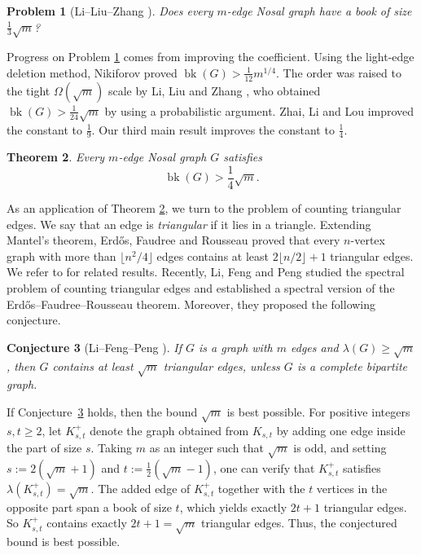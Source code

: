\documentclass[11pt,a4paper]{article}
\newtheorem{theorem}{Theorem}[section]
\newtheorem{conjecture}[theorem]{Conjecture}
\newtheorem{problem}[theorem]{Problem}
\theoremstyle{definition}
\theoremstyle{plain}
\newcommand{\bk}{\operatorname{bk}}
\renewcommand{\ge}{\geqslant}
\begin{document}
\begin{problem}[Li--Liu--Zhang \cite{LiLiuZhang26}] \label{prob-bk-13}
Does every $m$-edge Nosal graph have a book of size $\frac{1}{3}\sqrt{m}$? 
\end{problem}

Progress on Problem \ref{prob-bk-13} 
comes from improving the coefficient. 
Using the light-edge deletion method, 
Nikiforov \cite{Nikiforov21} proved $\bk(G)>\frac1{12}m^{1/4}$. 
The order was raised to the tight 
$\Omega (\sqrt{m})$ scale by Li, Liu and Zhang \cite{LiLiuZhang26}, who obtained   $\bk(G)>\frac1{24}\sqrt{m}$ by using a probabilistic argument. 
Zhai, Li and Lou \cite{ZhaiLiLou26} improved the constant to $\frac19$.  
Our third main result improves the constant to $\frac{1}{4}$. 

\begin{theorem} \label{thm-size-14}
Every $m$-edge Nosal graph $G$ satisfies
$$ \bk(G)>\frac14\sqrt{m}. $$
\end{theorem}


As an application of Theorem \ref{thm-size-14}, 
we turn to the problem of counting  triangular edges. 
We say that an edge is \emph{triangular} if it lies in a triangle.
Extending Mantel's theorem, Erd\H{o}s, Faudree and Rousseau \cite{EFR1992}
proved that every $n$-vertex graph with more than $\lfloor n^2/4\rfloor$ edges
contains at least $2\lfloor n/2\rfloor +1$ triangular edges. We refer to \cite{FM2017, GL2018, GHV2019} for related results. 
Recently, Li, Feng and Peng \cite{LFP2024-triangular} studied the spectral 
problem of counting triangular edges and established a spectral version of
the Erd\H{o}s--Faudree--Rousseau theorem. Moreover, they proposed the
following conjecture.

\begin{conjecture}[Li--Feng--Peng \cite{LFP2024-triangular}]
\label{thm-main2}
If $G$ is a graph with $m$ edges and $\lambda (G)\ge \sqrt{m}$, then $G$ contains at least $\sqrt{m}$ triangular edges, unless $G$ is a complete bipartite graph. 
\end{conjecture}

If Conjecture~\ref{thm-main2} holds, then the bound $\sqrt{m}$ is best
possible. 
For positive integers $s,t\ge 2$, 
let $K_{s,t}^{+}$ denote the
graph obtained from $K_{s,t}$ by adding one
edge inside the part of size $s$. Taking $m$ as an integer such that $\sqrt{m}$ is odd, and setting  $s:=2(\sqrt{m}+1)$ and $t:=\tfrac{1}{2}(\sqrt{m}-1)$, one can verify that $K_{s,t}^+$ satisfies $\lambda (K_{s,t}^+) = \sqrt{m}$. 
The added edge of $K_{s,t}^+$  
together with the $t$ vertices in the opposite
part span a book of size $t$, which   
yields exactly $2t+1$ triangular edges. So $K_{s,t}^+$ contains exactly $2t+1=\sqrt{m}$ triangular edges. Thus, the conjectured bound is best possible. 
\end{document}
